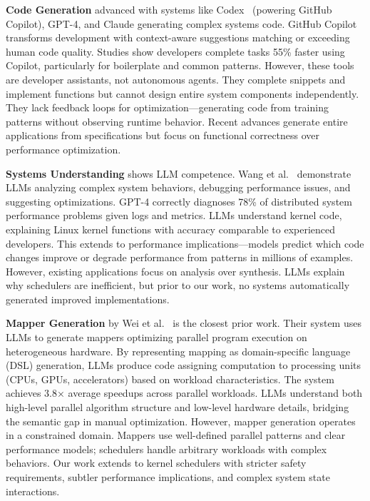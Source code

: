\textbf{Code Generation} advanced with systems like Codex~\cite{chen2021codex} (powering GitHub Copilot), GPT-4, and Claude generating complex systems code. GitHub Copilot transforms development with context-aware suggestions matching or exceeding human code quality. Studies show developers complete tasks 55\% faster using Copilot, particularly for boilerplate and common patterns. However, these tools are developer assistants, not autonomous agents. They complete snippets and implement functions but cannot design entire system components independently. They lack feedback loops for optimization—generating code from training patterns without observing runtime behavior. Recent advances generate entire applications from specifications but focus on functional correctness over performance optimization.

\textbf{Systems Understanding} shows LLM competence. Wang et al.~\cite{wang2024llmsys} demonstrate LLMs analyzing complex system behaviors, debugging performance issues, and suggesting optimizations. GPT-4 correctly diagnoses 78\% of distributed system performance problems given logs and metrics. LLMs understand kernel code, explaining Linux kernel functions with accuracy comparable to experienced developers. This extends to performance implications—models predict which code changes improve or degrade performance from patterns in millions of examples. However, existing applications focus on analysis over synthesis. LLMs explain why schedulers are inefficient, but prior to our work, no systems automatically generated improved implementations.

\textbf{Mapper Generation} by Wei et al.~\cite{wei2024mapper} is the closest prior work. Their system uses LLMs to generate mappers optimizing parallel program execution on heterogeneous hardware. By representing mapping as domain-specific language (DSL) generation, LLMs produce code assigning computation to processing units (CPUs, GPUs, accelerators) based on workload characteristics. The system achieves 3.8× average speedups across parallel workloads. LLMs understand both high-level parallel algorithm structure and low-level hardware details, bridging the semantic gap in manual optimization. However, mapper generation operates in a constrained domain. Mappers use well-defined parallel patterns and clear performance models; schedulers handle arbitrary workloads with complex behaviors. Our work extends to kernel schedulers with stricter safety requirements, subtler performance implications, and complex system state interactions.

